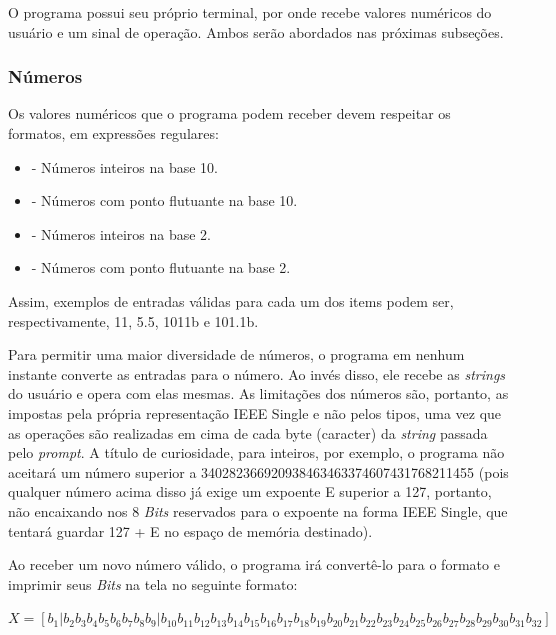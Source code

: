 \documentclass[11pt]{article}
\begin{document}
\indent\indent O programa possui seu próprio terminal, por onde recebe valores numéricos do usuário e um sinal de operação. Ambos serão
abordados nas próximas subseções.

\subsubsection{Números}

\indent\indent Os valores numéricos que o programa podem receber devem respeitar os formatos, em expressões regulares:

\begin{itemize}
  \item {\ttfamily{[0-9]+}} - Números inteiros na base 10.
  \item {} - Números com ponto flutuante na base 10.
  \item {} - Números inteiros na base 2.
  \item {} - Números com ponto flutuante na base 2.
\end{itemize}

Assim, exemplos de entradas válidas para cada um dos items podem ser, respectivamente, 11, 5.5, 1011b e 101.1b.

Para permitir uma maior diversidade de números, o programa em nenhum instante converte as entradas para o número. Ao invés disso,
ele recebe as \textit{strings} do usuário e opera com elas mesmas. As limitações dos números são, portanto, as impostas pela própria representação
IEEE Single e não pelos tipos, uma vez que as operações são realizadas em cima de cada byte (caracter) da \textit{string} passada pelo \textit{prompt}.
A título de curiosidade, para inteiros, por exemplo, o programa não aceitará um número superior a 340282366920938463463374607431768211455 (pois qualquer número acima
disso já exige um expoente E superior a 127, portanto, não encaixando nos 8 \textit{Bits} reservados para o expoente na forma IEEE Single, que tentará guardar 127 + E no espaço
de memória destinado).

Ao receber um novo número válido, o programa irá convertê-lo para o formato e imprimir seus \textit{Bits} na tela no seguinte formato:
\begin{center}
  {\small$ X = [ b_1 | b_2 b_3 b_4 b_5 b_6 b_7 b_8 b_9 | b_{10} b_{11} b_{12} b_{13} b_{14} b_{15} b_{16} b_{17} b_{18} b_{19} b_{20} b_{21} b_{22} b_{23} b_{24} b_{25} b_{26} b_{27} b_{28} b_{29} b_{30} b_{31} b_{32}] $}
\end{center}
\end{document}
